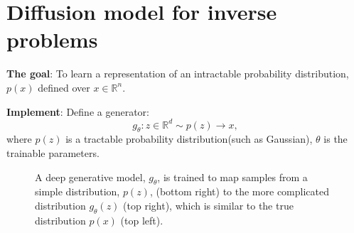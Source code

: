 \documentclass[mathserif,envcountsect,compress,8pt]{beamer}
\begin{document}
\section{Diffusion model for inverse problems}
\begin{frame}
	\setlength{\parskip}{0.6\baselineskip}
	\textbf{The goal}:  To learn a representation of an {\color{blue}intractable probability distribution},
	$p(x)$ defined over $x\in\mathbb{R}^{n}$.
	
	\textbf{Implement}: Define a generator:
	\begin{equation*}
		g_{\theta}:z\in \mathbb{R}^d\sim p(z) \to x,
	\end{equation*}
	where $p(z)$ is a tractable probability distribution(such as Gaussian), $\theta$ is the trainable parameters.
	
	\begin{figure}[H]
		\centering
		\centering
		\caption{A deep generative model, $g_{\theta}$, is trained to map samples from a simple distribution, $p(z)$, (bottom
			right) to the more complicated distribution $g_{\theta}(z)$ (top right), which is similar to the true distribution $p(x)$
			(top left).}\label{fig_1}
	\end{figure}
	
	
	
\end{frame}

\end{document}
